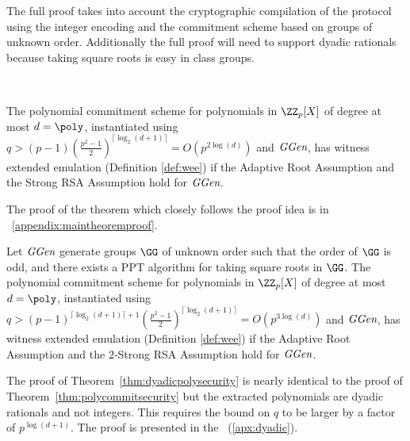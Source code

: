 The full proof takes into account the cryptographic compilation of the protocol using the integer encoding and the commitment scheme based on groups of unknown order. Additionally the full proof will need to support dyadic rationals because taking square roots is easy in class groups.






\newcommand{\maintheorem}{
The polynomial commitment scheme for polynomials in $\ZZ_p[X]$ of degree at most $d=\poly$, instantiated using $q>(p-1)(\frac{p^2-1}{2})^{\lceil \log_2(d+1)\rceil}=O(p^{2\log(d)})$ and $\ggen$, has witness extended emulation (Definition \ref{def:wee}) if the Adaptive Root Assumption and the Strong RSA Assumption hold for $\ggen$.
}
\begin{theorem}~\label{thm:polycommitsecurity} 
	\maintheorem
\end{theorem}
The proof of the theorem which closely follows the proof idea is in \appendixphrase~\ref{appendix:maintheoremproof}.




\newcommand{\dyadicmaintheorem}{
Let $\ggen$ generate groups $\GG$ of unknown order such that the order of $\GG$ is odd, and there exists a PPT algorithm for taking square roots in $\GG$. The polynomial commitment scheme for polynomials in $\ZZ_p[X]$ of degree at most $d=\poly$, instantiated using $q>(p-1)^{\lceil\log_2(d+1)\rceil+1}(\frac{p^2-1}{2})^{\lceil \log_2(d+1)\rceil}=O(p^{3\log(d)})$ and $\ggen$, has witness extended emulation (Definition \ref{def:wee}) if the Adaptive Root Assumption and the  $2$-Strong RSA Assumption hold for $\ggen$.
}
\begin{theorem}
\label{thm:dyadicpolysecurity}	
\dyadicmaintheorem
\end{theorem}
The proof of Theorem~\ref{thm:dyadicpolysecurity} is nearly identical to the proof of Theorem~\ref{thm:polycommitsecurity} but the extracted polynomials are dyadic rationals and not integers. This requires the bound on $q$ to be larger by a factor of $p^{\log(d+1)}$. The proof is presented in the \appendixphrase~(\ref{apx:dyadic}).

